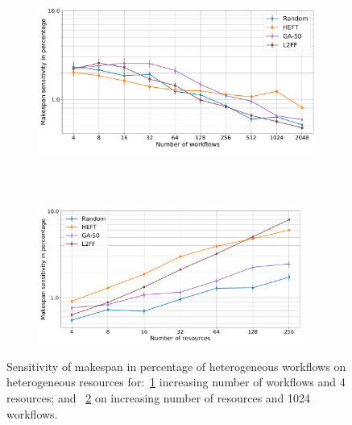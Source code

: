 \begin{figure}[ht!]
    \centering
    \begin{subfigure}[b]{0.85\textwidth}
        \includegraphics[width=.95\textwidth]{figures/campaign/StHeteroCampaigns_4DynHeteroResourcesSens.pdf}
        \caption{}
        \label{fig:StHeteroCampaigns_4DyHeteroResourcesSens}
    \end{subfigure}\\
    ~ 
    \begin{subfigure}[b]{0.85\textwidth}
        \includegraphics[width=0.95\textwidth]{figures/campaign/DynHeteroResources_StHeteroCampaignsSens.pdf}
        \caption{}
        \label{fig:DyHeteroResources_StHeteroCampaignsSens}
    \end{subfigure}
    \caption{Sensitivity of makespan in percentage of heterogeneous workflows on heterogeneous resources for:~\ref{fig:StHeteroCampaigns_4DyHeteroResourcesSens}  increasing number of workflows and 4 resources; and
    ~\ref{fig:DyHeteroResources_StHeteroCampaignsSens} on increasing number of resources and 1024 workflows.}
    \label{fig:dyn_hetero_sens_analysis}
\end{figure}

